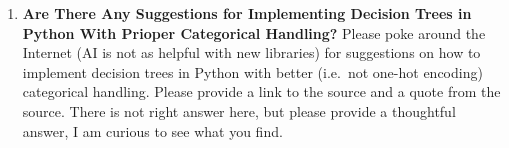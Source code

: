 \documentclass[
  letterpaper,
  DIV=11,
  numbers=noendperiod]{scrartcl}
\providecommand{\tightlist}{%
  \setlength{\itemsep}{0pt}\setlength{\parskip}{0pt}}
\begin{document}
\begin{enumerate}
\def\labelenumi{\arabic{enumi}.}
\setcounter{enumi}{2}
\tightlist
\item
  \textbf{Are There Any Suggestions for Implementing Decision Trees in
  Python With Prioper Categorical Handling?} Please poke around the
  Internet (AI is not as helpful with new libraries) for suggestions on
  how to implement decision trees in Python with better (i.e.~not
  one-hot encoding) categorical handling. Please provide a link to the
  source and a quote from the source. There is not right answer here,
  but please provide a thoughtful answer, I am curious to see what you
  find.
\end{enumerate}
\end{document}
